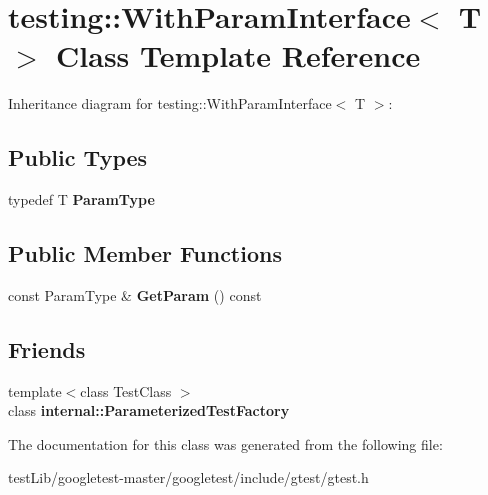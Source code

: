 \hypertarget{classtesting_1_1WithParamInterface}{}\section{testing\+:\+:With\+Param\+Interface$<$ T $>$ Class Template Reference}
\label{classtesting_1_1WithParamInterface}


Inheritance diagram for testing\+:\+:With\+Param\+Interface$<$ T $>$\+:
\subsection*{Public Types}
\begin{DoxyCompactItemize}
\item 
\mbox{\label{classtesting_1_1WithParamInterface_a343febaaebf1f025bda484f841d4fec1}} 
typedef T {\bfseries Param\+Type}
\end{DoxyCompactItemize}
\subsection*{Public Member Functions}
\begin{DoxyCompactItemize}
\item 
\mbox{\label{classtesting_1_1WithParamInterface_aa7b9028f06ee7ec1174bb25317b07eb2}} 
const Param\+Type \& {\bfseries Get\+Param} () const
\end{DoxyCompactItemize}
\subsection*{Friends}
\begin{DoxyCompactItemize}
\item 
\mbox{\label{classtesting_1_1WithParamInterface_a7543eb7df89f00fff517dba24bc11dd5}} 
{\footnotesize template$<$class Test\+Class $>$ }\\class {\bfseries internal\+::\+Parameterized\+Test\+Factory}
\end{DoxyCompactItemize}


The documentation for this class was generated from the following file\+:\begin{DoxyCompactItemize}
\item 
test\+Lib/googletest-\/master/googletest/include/gtest/gtest.\+h\end{DoxyCompactItemize}
